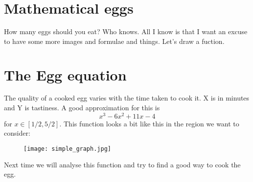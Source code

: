 

\startEntry{}
\section{Mathematical eggs}
How many eggs should you eat? Who knows. All I know is that I want an excuse to have some more images and formulae and things.
Let's draw a fuction.
\section{The Egg equation}
The quality of a cooked egg varies with the time taken to cook it. X is in minutes and Y is tastiness. A good approximation for this is \[x^3 - 6x^2 + 11x - 4\] for $x \in [1/2, 5/2]$.
This function looks a bit like this in the region we want to consider:
\begin{figure}[h]
\texttt{[image: simple\_graph.jpg]}
\end{figure}

Next time we will analyse this function and try to find a good way to cook the egg.
\finishEntry{}